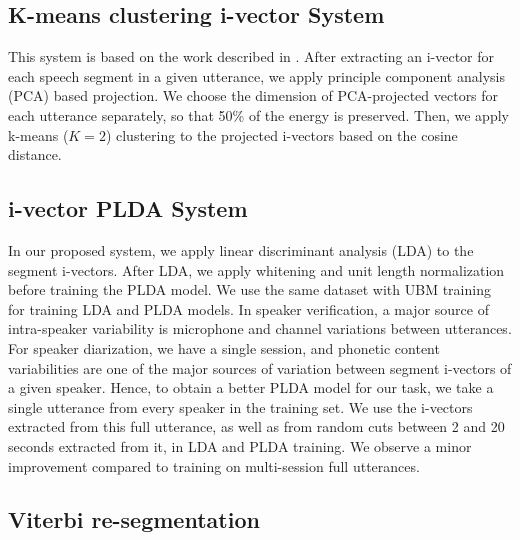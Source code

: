 \documentclass{article}
\begin{document}
\subsection{K-means clustering i-vector System}

This system is based on the work described in \cite{shum2011intraconv}. After extracting an i-vector for each speech segment in a given utterance, we apply principle component analysis (PCA) based projection. We choose the dimension of PCA-projected vectors for each utterance separately, so that 50\% of the energy is preserved. Then, we apply k-means ($K=2$) clustering to the projected i-vectors based on the cosine distance. 

\subsection{i-vector PLDA System}

In our proposed system, we apply linear discriminant analysis (LDA) to the segment i-vectors. After LDA, we apply whitening and unit length normalization before training the PLDA model. We use the same dataset with UBM training for training LDA and PLDA models. In speaker verification, a major source of intra-speaker variability is microphone and channel variations between utterances. For speaker diarization, we have a single session, and phonetic content variabilities are one of the major sources of variation between segment i-vectors of a given speaker. Hence, to obtain a better PLDA model for our task, we take a single utterance from every speaker in the training set. We use the i-vectors extracted from this full utterance, as well as from random cuts between 2 and 20 seconds extracted from it, in LDA and PLDA training. We observe a minor improvement compared to training on multi-session full utterances. 

\subsection{Viterbi re-segmentation}
\end{document}
